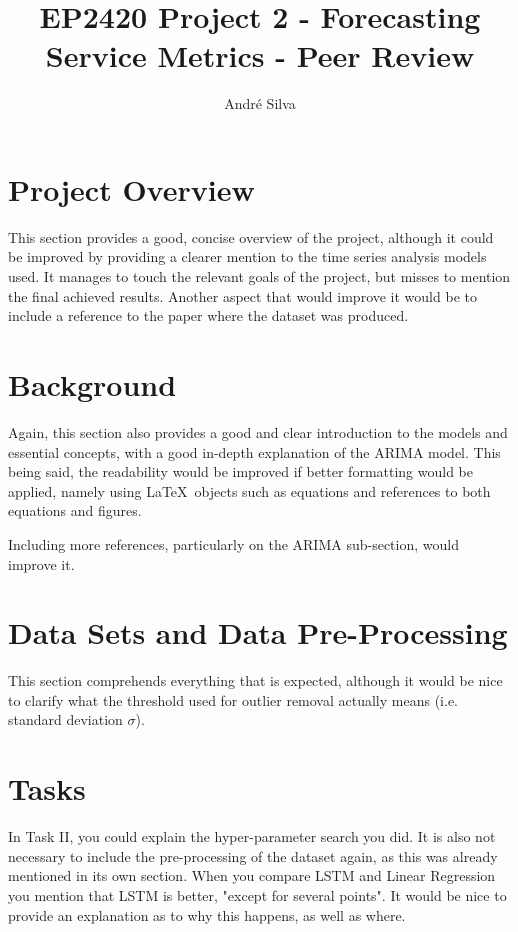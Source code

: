 \documentclass[10pt]{article}
\title{EP2420 Project 2 - Forecasting Service Metrics - Peer Review}
\author{André Silva}
\begin{document}
\maketitle

\section{Project Overview}

This section provides a good, concise overview of the project, although it could be improved by providing a clearer mention to the time series analysis models used. It manages to touch the relevant goals of the project, but misses to mention the final achieved results. Another aspect that would improve it would be to include a reference to the paper where the dataset was produced.

\section{Background}

Again, this section also provides a good and clear introduction to the models and essential concepts, with a good in-depth explanation of the ARIMA model. This being said, the readability would be improved if better formatting would be applied, namely using \LaTeX\ objects such as equations and references to both equations and figures.

Including more references, particularly on the ARIMA sub-section, would improve it.

\section{Data Sets and Data Pre-Processing}

This section comprehends everything that is expected, although it would be nice to clarify what the threshold used for outlier removal actually means (i.e. standard deviation $\sigma$).

\section{Tasks}

In Task II, you could explain the hyper-parameter search you did. It is also not necessary to include the pre-processing of the dataset again, as this was already mentioned in its own section. When you compare LSTM and Linear Regression you mention that LSTM is better, "except for several points". It would be nice to provide an explanation as to why this happens, as well as where.
\end{document}
